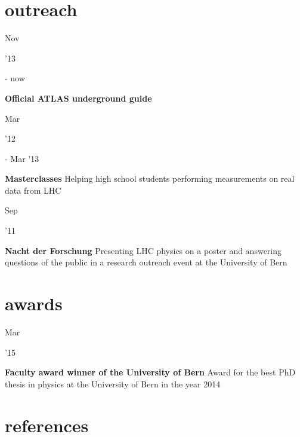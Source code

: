 \documentclass[]{cv} %
\begin{document}
\section{outreach}

\begin{entrylist}

  \entry
  {\parbox[t]{\parboxWidthOne}{Nov}\parbox[t]{\parboxWidthTwo}{\hfill '13} - now}
  {\textbf{Official ATLAS underground guide}}
  {}
  {}

  \entry
  {\parbox[t]{\parboxWidthOne}{Mar}\parbox[t]{\parboxWidthTwo}{\hfill '12} - Mar
'13}
  {\textbf{Masterclasses}}
  {}
  {Helping high school students performing measurements on real data from LHC}

  \entry
  {\parbox[t]{\parboxWidthOne}{Sep}\parbox[t]{\parboxWidthTwo}{\hfill '11}}
  {\textbf{Nacht der Forschung}}
  {}
  {Presenting LHC physics on a poster and answering questions of the public in a
  research outreach event at the University of Bern}

\end{entrylist}

\section{awards}

\begin{entrylist}

  \entry
  {\parbox[t]{\parboxWidthOne}{Mar} '15}
  {\textbf{Faculty award winner of the University of Bern}}
  {}
  {Award for the best PhD thesis in physics at the University of Bern in the
  year 2014}

\end{entrylist}

\section{references}
\end{document}
